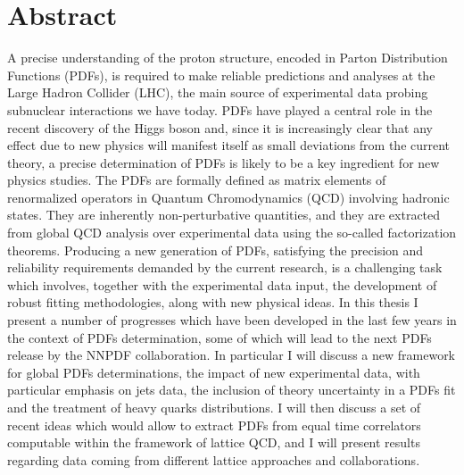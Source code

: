 \chapter*{Abstract}
A precise understanding of the proton structure, encoded in Parton Distribution Functions (PDFs), is required 
to make reliable predictions and analyses at the Large Hadron Collider (LHC), 
the main source of experimental data probing subnuclear interactions we have today.
PDFs have played a central role in the recent 
discovery of the Higgs boson and, since it is increasingly clear that any effect due to new physics 
will manifest itself as small deviations from the current theory, 
a precise determination of PDFs is likely to be a key ingredient 
for new physics studies.
%
The PDFs are formally defined as matrix elements of renormalized operators in Quantum Chromodynamics (QCD) involving hadronic states.
They are inherently non-perturbative quantities, and they are extracted from global QCD analysis over
experimental data using the so-called factorization theorems. 
Producing a new generation of PDFs, satisfying the precision and reliability requirements demanded by the current research,
is a challenging task which involves, together with the experimental data input, the development of robust
fitting methodologies, along with new physical ideas. 
%
In this thesis I present a number of progresses which have been developed in the last few years in the context of 
PDFs determination, some of which will lead to the next PDFs release by the NNPDF collaboration. 
In particular I will discuss a new framework for global PDFs determinations, the impact of new experimental data,
with particular emphasis on jets data, the inclusion of theory uncertainty in a PDFs fit 
and the treatment of heavy quarks distributions.
%
I will then discuss a set of recent ideas which would allow to extract PDFs from equal time correlators computable 
within the framework of lattice QCD, and I will present results regarding data coming from different 
lattice approaches and collaborations.

\blankpage

